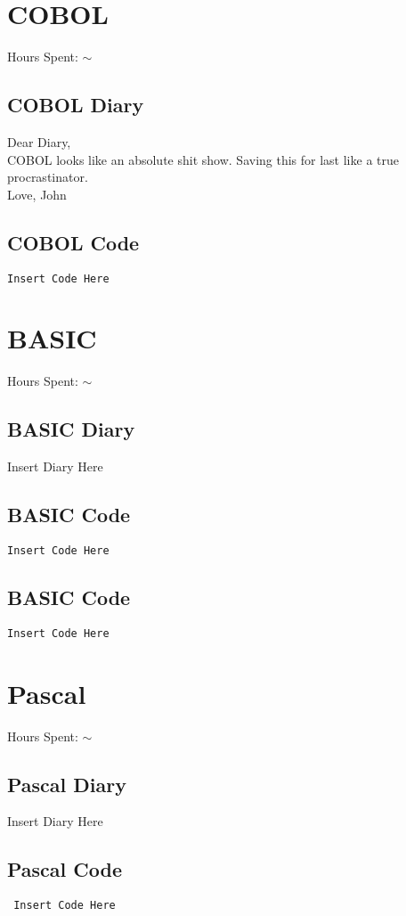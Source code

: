 \documentclass{report}
\begin{document}
\section*{COBOL}
Hours Spent: $\sim$
\subsection*{COBOL Diary}
Dear Diary,
\\
COBOL looks like an absolute shit show. Saving this for last like a true procrastinator.
\\
Love, John

\subsection*{COBOL Code}
\begin{lstlisting}
Insert Code Here
\end{lstlisting}


\section*{BASIC}
Hours Spent: $\sim$
\subsection*{BASIC Diary}
Insert Diary Here

\subsection*{BASIC Code}
\begin{lstlisting}
Insert Code Here
\end{lstlisting}


\subsection*{BASIC Code}
\begin{lstlisting}
Insert Code Here
\end{lstlisting}


\section*{Pascal}
Hours Spent: $\sim$
\subsection{Pascal Diary}
Insert Diary Here

\subsection*{Pascal Code}
\begin{lstlisting}
 Insert Code Here
\end{lstlisting}
\end{document}
